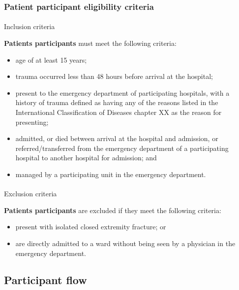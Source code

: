 \documentclass[
]{scrartcl}
\makeatletter
\let\oldparagraph\paragraph
\renewcommand{\paragraph}{
    \@ifstar
      \xxxParagraphStar
      \xxxParagraphNoStar
  }
\newcommand{\xxxParagraphStar}[1]{\oldparagraph*{#1}\mbox{}}
\newcommand{\xxxParagraphNoStar}[1]{\oldparagraph{#1}\mbox{}}
\providecommand{\tightlist}{%
  \setlength{\itemsep}{0pt}\setlength{\parskip}{0pt}}\usepackage{longtable,booktabs,array}
\makeatother
\begin{document}
\subsubsection{Patient participant eligibility
criteria}\label{sec-patient-participant-eligibility-criteria}

\paragraph{Inclusion criteria}\label{inclusion-criteria-1}

\textbf{Patients participants} must meet the following criteria:

\begin{itemize}
\tightlist
\item
  age of at least 15 years;
\item
  trauma occurred less than 48 hours before arrival at the hospital;
\item
  present to the emergency department of participating hospitals, with a
  history of trauma defined as having any of the reasons listed in the
  International Classification of Diseases chapter XX as the reason for
  presenting;
\item
  admitted, or died between arrival at the hospital and admission, or
  referred/transferred from the emergency department of a participating
  hospital to another hospital for admission; and
\item
  managed by a participating unit in the emergency department.
\end{itemize}

\paragraph{Exclusion criteria}\label{exclusion-criteria-1}

\textbf{Patients participants} are excluded if they meet the following
criteria:

\begin{itemize}
\tightlist
\item
  present with isolated closed extremity fracture; or
\item
  are directly admitted to a ward without being seen by a physician in
  the emergency department.
\end{itemize}

\subsection{Participant flow}\label{sec-participant-flow}
\end{document}

